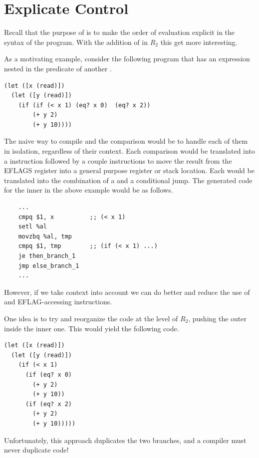 \documentclass[11pt]{book}
\begin{document}
\section{Explicate Control}
\label{sec:explicate-control-r2}

Recall that the purpose of  is to make the
order of evaluation explicit in the syntax of the program.  With the
addition of  in $R_2$ this get more interesting.

As a motivating example, consider the following program that has an
 expression nested in the predicate of another .
\begin{center}
\begin{minipage}{0.96\textwidth}
\begin{lstlisting}
(let ([x (read)])
  (let ([y (read)])
    (if (if (< x 1) (eq? x 0)  (eq? x 2))
        (+ y 2)
        (+ y 10))))
\end{lstlisting}
\end{minipage}
\end{center}
%
The naive way to compile  and the comparison would be to
handle each of them in isolation, regardless of their context.  Each
comparison would be translated into a  instruction followed
by a couple instructions to move the result from the EFLAGS register
into a general purpose register or stack location. Each  would
be translated into the combination of a  and a conditional
jump. The generated code for the inner  in the above example
would be as follows.
\begin{center}
\begin{minipage}{0.96\textwidth}
\begin{lstlisting}
    ...
    cmpq $1, x          ;; (< x 1)
    setl %al
    movzbq %al, tmp
    cmpq $1, tmp        ;; (if (< x 1) ...)
    je then_branch_1
    jmp else_branch_1
    ...
\end{lstlisting}
\end{minipage}
\end{center}
However, if we take context into account we can do better and reduce
the use of  and EFLAG-accessing instructions.

One idea is to try and reorganize the code at the level of $R_2$,
pushing the outer  inside the inner one. This would yield the
following code.
\begin{center}
\begin{minipage}{0.96\textwidth}
\begin{lstlisting}
(let ([x (read)])
  (let ([y (read)])
    (if (< x 1) 
      (if (eq? x 0)
        (+ y 2)
        (+ y 10))
      (if (eq? x 2)
        (+ y 2)
        (+ y 10)))))
\end{lstlisting}
\end{minipage}
\end{center}
Unfortunately, this approach duplicates the two branches, and a
compiler must never duplicate code!
\end{document}
